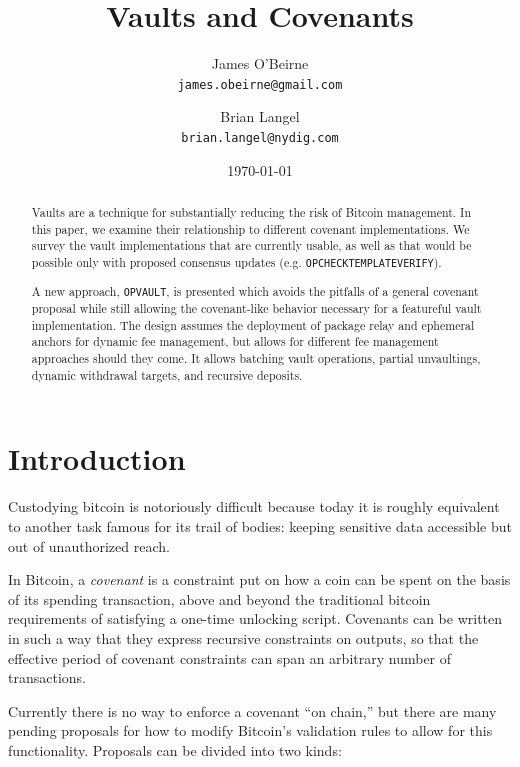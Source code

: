 \documentclass[10pt]{article}
\author{James O'Beirne \\
  \texttt{james.obeirne@gmail.com}
\and
  Brian Langel \\
  \texttt{brian.langel@nydig.com} \\}
\date{\today}
\title{Vaults and Covenants}
\begin{document}
\newcommand{\ctv}{\texttt{OP\textunderscore{}CHECKTEMPLATEVERIFY}}
\newcommand{\opv}{\texttt{OP\textunderscore{}VAULT}}
\newcommand{\opuv}{\texttt{OP\textunderscore{}UNVAULT}}
\newcommand{\spk}{\code{scriptPubKey}}
\newcommand{\code}[1]{\texttt{#1}}


\maketitle
\begin{abstract}

  Vaults are a technique for substantially reducing the risk of Bitcoin management. In
  this paper, we examine their relationship to different covenant implementations. We
  survey the vault implementations that are currently usable, as well as that would be
  possible only with proposed consensus updates (e.g. \ctv{}). 

  A new approach, \opv{}, is presented which avoids the pitfalls of a general
  covenant proposal while still allowing the covenant-like behavior necessary for a
  featureful vault implementation. The design assumes the deployment of package relay
  and ephemeral anchors for dynamic fee management, but allows for different fee
  management approaches should they come. It allows batching vault operations, partial
  unvaultings, dynamic withdrawal targets, and recursive deposits.

\end{abstract}

\section*{Introduction}

Custodying bitcoin is notoriously difficult because today it is roughly equivalent to
another task famous for its trail of bodies: keeping sensitive data accessible but out
of unauthorized reach.

In Bitcoin, a \emph{covenant} is a constraint put on how a coin can be spent on the
basis of its spending transaction, above and beyond the traditional bitcoin
requirements of satisfying a one-time unlocking script. Covenants can be written in
such a way that they express recursive constraints on outputs, so that the effective
period of covenant constraints can span an arbitrary number of transactions. 

Currently there is no way to enforce a covenant ``on chain,'' but there are many
pending proposals for how to modify Bitcoin's validation rules to allow for this
functionality. Proposals can be divided into two kinds:
\end{document}
